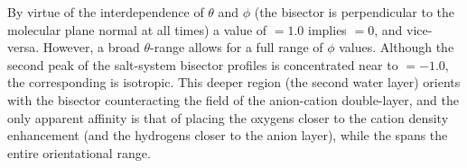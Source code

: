 By virtue of the interdependence of $\theta$ and $\phi$ (the bisector is perpendicular to the molecular plane normal at all times) a value of \cosphi$=1.0$ implies \costheta$=0$, and vice-versa. However, a broad $\theta$-range allows for a full range of $\phi$ values. Although the second peak of the salt-system bisector profiles is concentrated near to \costheta$=-1.0$, the corresponding \phiprof is isotropic. This deeper region (the second water layer) orients with the bisector counteracting the field of the anion-cation double-layer, and the only apparent affinity is that of placing the oxygens closer to the cation density enhancement (and the hydrogens closer to the anion layer), while the \phiprof spans the entire orientational range.

